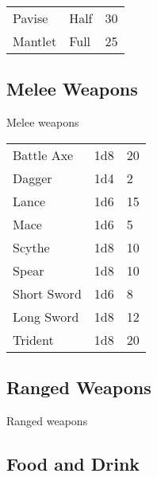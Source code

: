 \begin{multicols}{2}
\begin{center}
{
\begin{xtabular}{|l|l|l|}
Pavise & Half & 30 \\
Mantlet & Full & 25 \\
\hline
\end{xtabular}
}
\end{center}

\subsection{Melee Weapons}

Melee weapons

\begin{center}
{
\begin{xtabular}{|l|l|l|}
Battle Axe & 1d8 & 20 \\
Dagger & 1d4 & 2 \\
Lance & 1d6 & 15 \\
Mace & 1d6 & 5 \\
Scythe & 1d8 & 10 \\
Spear & 1d8 & 10 \\
Short Sword & 1d6 & 8 \\
Long Sword & 1d8 & 12 \\
Trident & 1d8 & 20 \\
\hline
\end{xtabular}
}
\end{center}

\subsection{Ranged Weapons}

Ranged weapons

\subsection{Food and Drink}


\end{multicols}
